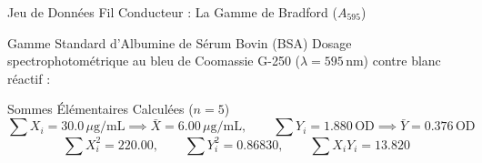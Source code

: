 \documentclass[aspectratio=169,10pt]{beamer}
\begin{document}
\begin{frame}{Jeu de Données Fil Conducteur : La Gamme de Bradford ($A_{595}$)}
  \begin{biobox}{Gamme Standard d'Albumine de Sérum Bovin (BSA)}
    \footnotesize
    Dosage spectrophotométrique au bleu de Coomassie G-250 ($\lambda = 595\,\text{nm}$) contre blanc réactif :
    \begin{center}
    \end{center}
  \end{biobox}
  \vspace{1mm}
  \begin{conceptbox}{Sommes Élémentaires Calculées ($n = 5$)}
    \footnotesize
    \begin{equation*}
      \sum X_i = 30.0\,\mu\text{g/mL} \implies \bar{X} = 6.00\,\mu\text{g/mL}, \qquad \sum Y_i = 1.880\,\text{OD} \implies \bar{Y} = 0.376\,\text{OD}
    \end{equation*}
    \begin{equation*}
      \sum X_i^2 = 220.00, \qquad \sum Y_i^2 = 0.86830, \qquad \sum X_i Y_i = 13.820
    \end{equation*}
  \end{conceptbox}
\end{frame}
\end{document}
